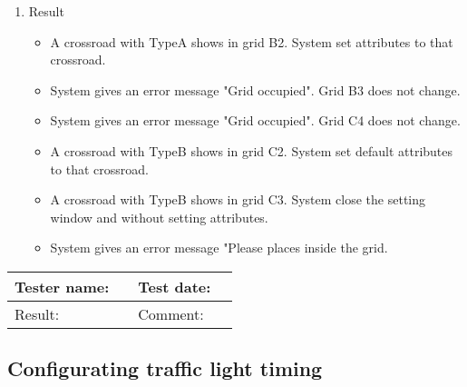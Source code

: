 \begin{enumerate}
	\item Result
	\begin{itemize}
		\item A crossroad with TypeA shows in grid B2. System set attributes to that crossroad.
		\item System gives an  error message "Grid occupied". Grid B3 does not change.
		\item System gives an  error message "Grid occupied". Grid C4 does not change.
		\item A crossroad with TypeB shows in grid C2. System set default attributes to that crossroad.
		\item A crossroad with TypeB shows in grid C3. System close the setting window and without setting attributes.
		\item System gives an error message "Please places inside the grid.
	\end{itemize}
\end{enumerate}

\begin{tabularx}{\textwidth}{|p{3cm}X|p{3cm}X|}\hline
	Tester name: &  & Test date: & \\\hline
	Result: &   \pass & Comment: & \\\hline
\end{tabularx}

\newpage

\subsection{Configurating traffic light timing}

